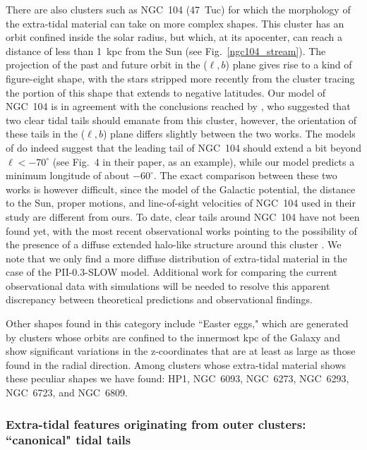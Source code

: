             There are also clusters such as NGC~104 (47~Tuc) for which the morphology of the extra-tidal material can take on more complex shapes. This cluster has an orbit confined inside the solar radius, but which, at its apocenter, can reach a distance of less than 1~kpc from the Sun (see Fig.~\ref{ngc104_stream}). The projection of the past and future orbit in the ($\ell, b$) plane gives rise to a kind of figure-eight shape, with the stars stripped more recently from the cluster tracing the portion of this shape that extends to negative latitudes. Our model of NGC~104 is in agreement with the conclusions reached by \citet{2012MNRAS.423.2845L}, who suggested that two clear tidal tails should emanate from this cluster, however, the orientation of these tails in the ($\ell, b$) plane differs slightly between the two works. The models of \citet{2012MNRAS.423.2845L} do indeed suggest that the leading tail of NGC~104 should extend a bit beyond $\ell < -70^\circ$ (see Fig.~4 in their paper, as an example), while our model predicts a minimum longitude of about $-60^\circ$. The exact comparison between these two works is however difficult, since the model of the Galactic potential, the distance to the Sun, proper motions, and line-of-sight velocities of NGC~104 used in their study are different from ours. To date, clear tails around NGC~104 have not been found yet, with the most recent observational works pointing to the possibility of the presence of a diffuse extended halo-like structure around this cluster \citep[see][]{2017ApJ...846L..10P}. We note that we only find a more diffuse distribution of extra-tidal material in the case of the PII-0.3-SLOW model. Additional work for comparing the current observational data with simulations will be needed to resolve this apparent discrepancy between theoretical predictions and observational findings. 

            Other shapes found in this category include ``Easter eggs," which are generated by clusters whose orbits are confined to the innermost kpc of the Galaxy and show significant variations in the z-coordinates that are at least as large as those found in the radial direction. Among clusters whose extra-tidal material shows these peculiar shapes we have found: HP1, NGC~6093, NGC~6273, NGC~6293, NGC~6723, and NGC~6809.

        \subsubsection{Extra-tidal features originating from outer clusters: ``canonical" tidal tails}

